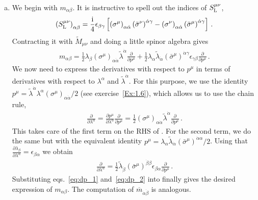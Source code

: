 \begin{enumerate}[a)]
\smallskip
\item We begin with $m_{\alpha\beta}$. It is instructive to spell out the indices of $S^{\mu\nu}_{\rm L}$,
\begin{align}
\left(S^{\mu\nu}_{\rm L}\right)_{\alpha\beta} = \frac{\mathrm{i}}{4}  \epsilon_{\beta\gamma} \left[
   \left(\sigma^{\mu}\right)_{\alpha\dot\alpha} \left(\bar{\sigma}^{\nu}\right)^{\dot\alpha\gamma} -
   \left(\sigma^{\nu}\right)_{\alpha\dot\alpha} \left(\bar{\sigma}^{\mu}\right)^{\dot\alpha\gamma} \right] \,.
\end{align}
Contracting it with $\tilde{M}_{\mu\nu}$ and doing a little spinor algebra gives
\begin{align} \label{eq:mab_ex}
m_{\alpha\beta} = \frac{1}{2} \lambda_{\beta}  \left(\sigma^{\mu}\right)_{\alpha\dot\alpha} \tilde{\lambda}^{\dot\alpha} \frac{\partial}{\partial p^{\mu}} +
\frac{1}{2} \lambda_{\alpha} \tilde{\lambda}_{\dot \alpha}  \left(\bar{\sigma}^{\mu}\right)^{\dot\alpha\gamma} \epsilon_{\gamma\beta} \frac{\partial}{\partial p^{\mu}} \,.
\end{align}
We now need to express the derivatives with respect to $p^{\mu}$ in terms of derivatives with respect to $\lambda^{\alpha}$ and $\tilde{\lambda}^{\dot\alpha}$. For this purpose, we use the identity $p^{\mu} = \tilde{\lambda}^{\dot\alpha} \lambda^{\alpha} \left(\sigma^{\mu}\right)_{\alpha\dot\alpha}/2$ (see exercise~\ref{Ex:1.6}), which allows us to use the chain rule,
\begin{align} \label{eq:dp_1}
\frac{\partial}{\partial \lambda^{\alpha}} = \frac{\partial p^{\mu}}{\partial \lambda^{\alpha}} \frac{\partial}{\partial p^{\mu}} = \frac{1}{2} \left(\sigma^{\mu}\right)_{\alpha\dot\alpha} \tilde{\lambda}^{\dot\alpha} \frac{\partial}{\partial p^{\mu}} \,.
\end{align}
This takes care of the first term on the RHS of . For the second term, we do the same but with the equivalent identity $p^{\mu} = \lambda_{\alpha} \tilde{\lambda}_{\dot\alpha} \left(\bar{\sigma}^{\mu}\right)^{\dot\alpha\alpha}/2$. Using that $\frac{\partial \lambda_{\beta}}{\partial \lambda^{\alpha}} = \epsilon_{\beta\alpha}$ we obtain 
\begin{align} \label{eq:dp_2}
\frac{\partial}{\partial \lambda^{\alpha}} = \frac{1}{2} \tilde{\lambda}_{\dot\beta}  \left(\bar{\sigma}^{\mu}\right)^{\dot\beta \beta}   \epsilon_{\beta \alpha} \frac{\partial}{\partial p^{\mu}} \,.
\end{align}
Substituting eqs.~\eqref{eq:dp_1} and~\eqref{eq:dp_2} into  finally gives the desired expression of $m_{\alpha \beta}$. The computation of $\overline{m}_{\dot\alpha \dot\beta}$ is analogous.


\end{enumerate}
